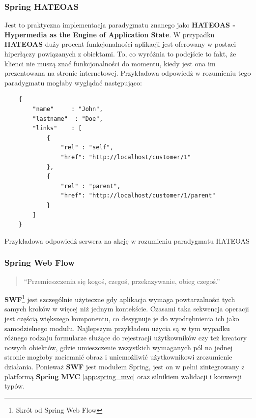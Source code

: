 		\subsubsection{Spring HATEOAS}
		\label{tech:spring_heatoas}
		\cite{spring_hateos} Jest to praktyczna implementacja paradygmatu znanego jako \textbf{HATEOAS - Hypermedia as the Engine of Application State}. W przypadku \textbf{HATEOAS} duży procent funkcjonalności aplikacji jest oferowany w postaci hiperłączy powiązanych z obiektami. To, co wyróżnia to podejście to fakt, że klienci nie muszą znać funkcjonalności do momentu, kiedy jest ona im prezentowana na stronie internetowej. Przykładowa odpowiedź w rozumieniu tego paradygmatu mogłaby wyglądać następująco:
		\begin{code}
			\begin{verbatim}
	{
	    "name"	   : "John",
	    "lastname"	: "Doe",
	    "links"	   : [
	        {
	            "rel" : "self",
	            "href": "http://localhost/customer/1"
	        },
	        {
	            "rel" : "parent",
	            "href": "http://localhost/customer/1/parent"
	        }
	    ]
	}
			\end{verbatim}
			\caption[Spring HATEOAS - Przykładowa odpowiedź]{Przykładowa odpowiedź serwera na akcję w rozumieniu paradygmatu HATEOAS}
			\label{app:spring_hetoas_response_example}
		\end{code}
		
		\subsubsection{Spring Web Flow}	
		\label{tech:spring_web_flow}
		\begin{quotation}
			``Przemieszczenia się kogoś, czegoś, przekazywanie, obieg czegoś.''\cite{polish_dictionary}
		\end{quotation}
		\textbf{SWF}\footnote{Skrót od Spring Web Flow} jest szczególnie użyteczne gdy aplikacja wymaga powtarzalności tych samych kroków w więcej niż jednym kontekście. Czasami taka sekwencja operacji jest częścią większego komponentu, co desygnuje je do wyodrębnienia ich jako samodzielnego modułu. Najlepszym przykładem użycia są w tym wypadku różnego rodzaju formularze służące do rejestracji użytkowników czy też kreatory nowych obiektów, gdzie umieszczenie wszystkich wymaganych pól na jednej stronie mogłoby zaciemnić obraz i uniemożliwić użytkownikowi zrozumienie działania. Ponieważ \textbf{SWF} jest modułem Spring, jest on w pełni zintegrowany z platformą \textbf{Spring MVC} \ref{app:spring_mvc} oraz silnikiem walidacji i konwersji typów.
		
